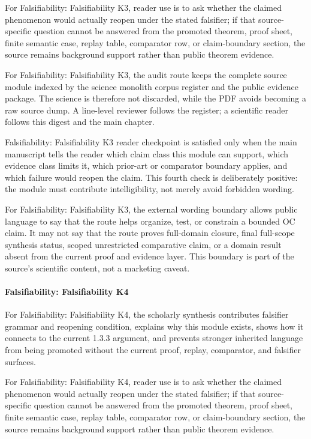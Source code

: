 For Falsifiability: Falsifiability K3, reader use is to ask whether the claimed phenomenon would actually reopen under the stated falsifier; if that source-specific question cannot be answered from the promoted theorem, proof sheet, finite semantic case, replay table, comparator row, or claim-boundary section, the source remains background support rather than public theorem evidence.


For Falsifiability: Falsifiability K3, the audit route keeps the complete source module indexed by the science monolith corpus register and the public evidence package. The science is therefore not discarded, while the PDF avoids becoming a raw source dump. A line-level reviewer follows the register; a scientific reader follows this digest and the main chapter.


Falsifiability: Falsifiability K3 reader checkpoint is satisfied only when the main manuscript tells the reader which claim class this module can support, which evidence class limits it, which prior-art or comparator boundary applies, and which failure would reopen the claim. This fourth check is deliberately positive: the module must contribute intelligibility, not merely avoid forbidden wording.


For Falsifiability: Falsifiability K3, the external wording boundary allows public language to say that the route helps organize, test, or constrain a bounded OC claim. It may not say that the route proves full-domain closure, final full-scope synthesis status, scoped unrestricted comparative claim, or a domain result absent from the current proof and evidence layer. This boundary is part of the source's scientific content, not a marketing caveat.


\paragraph{Falsifiability: Falsifiability K4}

For Falsifiability: Falsifiability K4, the scholarly synthesis contributes falsifier grammar and reopening condition, explains why this module exists, shows how it connects to the current 1.3.3 argument, and prevents stronger inherited language from being promoted without the current proof, replay, comparator, and falsifier surfaces.


For Falsifiability: Falsifiability K4, reader use is to ask whether the claimed phenomenon would actually reopen under the stated falsifier; if that source-specific question cannot be answered from the promoted theorem, proof sheet, finite semantic case, replay table, comparator row, or claim-boundary section, the source remains background support rather than public theorem evidence.


